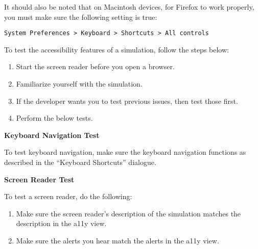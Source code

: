 \documentclass[titlepage]{article}
\begin{document}
It should also be noted that on Macintosh devices, for Firefox to work properly, you must make sure the following setting is true:

\verb|System Preferences > Keyboard > Shortcuts > All controls|

To test the accessibility features of a simulation, follow the steps below:

		\begin{enumerate}
			\item Start the screen reader before you open a browser.
			\item Familiarize yourself with the simulation.
			\item If the developer wants you to test previous issues, then test those first.
			\item Perform the below tests.
		\end{enumerate}

\textbf{Keyboard Navigation Test}

To test keyboard navigation, make sure the keyboard navigation functions as described in the ``Keyboard Shortcuts'' dialogue.

\textbf{Screen Reader Test}

To test a screen reader, do the following:
		\begin{enumerate}
			\item Make sure the screen reader's description of the simulation matches the description in the a11y view. 
			\item Make sure the alerts you hear match the alerts in the a11y view.
		\end{enumerate}

\pagebreak
\end{document}
